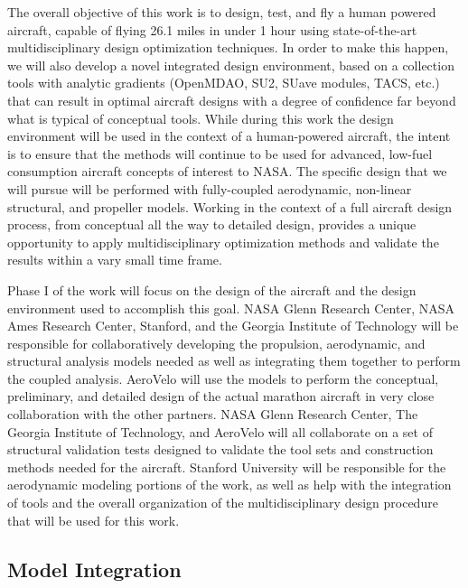 \documentclass[]{aiaa-tc}
\begin{document}
    The overall objective of this work is to design, test, and fly a human powered aircraft, 
    capable of flying 26.1 miles in under 1 hour using state-of-the-art multidisciplinary 
    design optimization techniques. In order to make this happen, we will also develop a novel integrated 
    design environment, based on a collection tools with analytic gradients (OpenMDAO, SU2, SUave 
    modules, TACS, etc.) that can result in optimal aircraft designs with a degree of confidence far beyond 
    what is typical of conceptual tools.   While during this work the design environment will be used in the 
    context of a human-powered aircraft,  the intent is to ensure that the methods will continue to be used 
    for advanced, low-fuel consumption aircraft concepts of interest to NASA.  The specific design that we will 
    pursue will be performed with fully-coupled aerodynamic, non-linear structural, and propeller models. Working 
    in the context of a full aircraft design process, from conceptual all the way to detailed design, 
    provides a unique opportunity to apply multidisciplinary optimization methods and validate
    the results within a vary small time frame. 

    Phase I of the work will focus on the design of the aircraft and the design environment used 
    to accomplish this goal. NASA Glenn Research Center, 
    NASA Ames Research Center, Stanford, and the Georgia Institute of Technology will be responsible 
    for collaboratively developing the propulsion, aerodynamic, and structural analysis 
    models needed as well as integrating them together to perform the coupled analysis. AeroVelo will
    use the models to perform the conceptual, preliminary, and detailed design of the actual marathon 
    aircraft in very close collaboration with the other partners. NASA Glenn Research Center, 
    The Georgia Institute of Technology, and AeroVelo will all collaborate on a set of structural validation 
    tests designed to validate the tool sets and construction methods needed for the aircraft.  Stanford 
    University will be responsible for the aerodynamic modeling portions of the work, as well as 
    help with the integration of tools and the overall organization of the multidisciplinary design 
    procedure that will be used for this work.

    \subsection{Model Integration}
\end{document}
